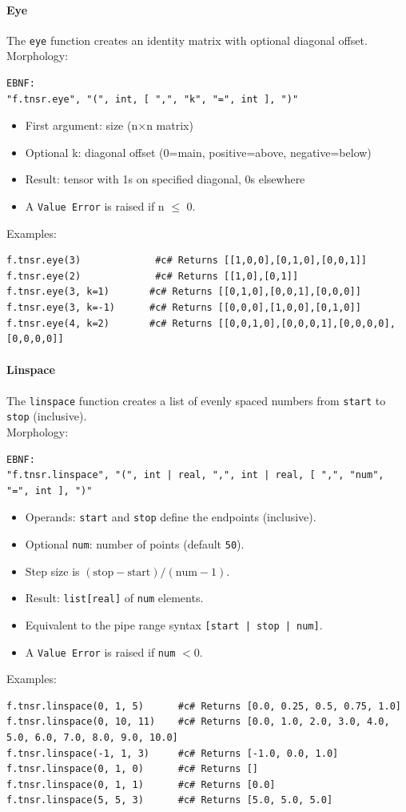 \paragraph{Eye}
The \texttt{eye} function creates an identity matrix with optional diagonal offset.\\
Morphology:
\begin{verbatim}
EBNF:
"f.tnsr.eye", "(", int, [ ",", "k", "=", int ], ")"
\end{verbatim}
\begin{itemize}
\item First argument: size (n$\times$n matrix)
\item Optional k: diagonal offset (0=main, positive=above, negative=below)
\item Result: tensor with 1s on specified diagonal, 0s elsewhere
\item A \texttt{Value Error} is raised if n $\leq$ 0.
\end{itemize}
Examples:
\begin{verbatim}
f.tnsr.eye(3)             #c# Returns [[1,0,0],[0,1,0],[0,0,1]]
f.tnsr.eye(2)             #c# Returns [[1,0],[0,1]]
f.tnsr.eye(3, k=1)       #c# Returns [[0,1,0],[0,0,1],[0,0,0]]
f.tnsr.eye(3, k=-1)      #c# Returns [[0,0,0],[1,0,0],[0,1,0]]
f.tnsr.eye(4, k=2)       #c# Returns [[0,0,1,0],[0,0,0,1],[0,0,0,0],[0,0,0,0]]
\end{verbatim}

\paragraph{Linspace}
The \texttt{linspace} function creates a list of evenly spaced numbers from \texttt{start} to \texttt{stop} (inclusive).\\
Morphology:
\begin{verbatim}
EBNF:
"f.tnsr.linspace", "(", int | real, ",", int | real, [ ",", "num", "=", int ], ")"
\end{verbatim}
\begin{itemize}
\item Operands: \texttt{start} and \texttt{stop} define the endpoints (inclusive).
\item Optional \texttt{num}: number of points (default \texttt{50}).
\item Step size is $(\text{stop} - \text{start}) / (\text{num} - 1)$.
\item Result: \texttt{list[real]} of \texttt{num} elements.
\item Equivalent to the pipe range syntax \texttt{[start | stop | num]}.
\item A \texttt{Value Error} is raised if \texttt{num} $< 0$.
\end{itemize}
Examples:
\begin{verbatim}
f.tnsr.linspace(0, 1, 5)      #c# Returns [0.0, 0.25, 0.5, 0.75, 1.0]
f.tnsr.linspace(0, 10, 11)    #c# Returns [0.0, 1.0, 2.0, 3.0, 4.0, 5.0, 6.0, 7.0, 8.0, 9.0, 10.0]
f.tnsr.linspace(-1, 1, 3)     #c# Returns [-1.0, 0.0, 1.0]
f.tnsr.linspace(0, 1, 0)      #c# Returns []
f.tnsr.linspace(0, 1, 1)      #c# Returns [0.0]
f.tnsr.linspace(5, 5, 3)      #c# Returns [5.0, 5.0, 5.0]
\end{verbatim}

